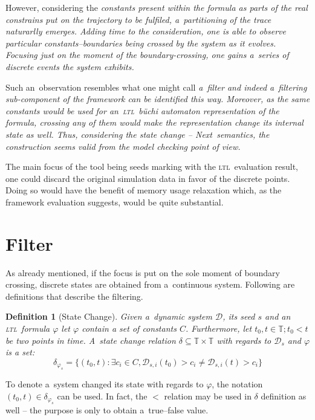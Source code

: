 \documentclass[12pt,oneside,draft]{fithesis}
\newcommand{\ltl}{\textsc{ltl}~}
\newcommand{\Next}{\emph{Next}~}
\newcommand{\mD}{\mathcal{D}}
\newcommand{\mTime}{\mathbb{T}}
\newtheorem{mydef}{Definition}
\begin{document}
However, considering the \em constants \rm present within the formula as parts of the real \em constrains \rm put on the 
trajectory to be fulfiled, a~partitioning of the trace naturarlly emerges. Adding time to the consideration, one is able to
observe particular constants--boundaries being crossed by the system as it evolves. \em Focusing just on the moment of
the boundary-crossing, one gains a~series of discrete events the system exhibits\rm{}.

Such an~observation resembles what one might call \em a~filter \rm and indeed a~filtering sub-component of the framework
can be identified this way. Moreover, as the same constants would be used for an~\ltl b\"{u}chi automaton representation of the formula, 
crossing any of them would make the representation change its internal state as well.
Thus, considering the state change -- \Next semantics, the construction seems valid from the model checking point of view.

The main focus of the tool being seeds marking with the \ltl evaluation result, one could discard the original simulation
data in favor of the discrete points.
Doing so would have the benefit of memory usage relaxation which, as the framework evaluation suggests, would be quite substantial.

\section{Filter}
As already mentioned, if the focus is put on the sole moment of boundary
crossing, discrete states are obtained from a~continuous system.
Following are definitions that describe the filtering.
\begin{mydef}[State Change]
Given a~dynamic system $\mD$, its seed $s$ and an \ltl formula $\varphi$
let $\varphi$ contain a set of constants $C$.
Furthermore, let $t_0,t\in\mTime;t_0<t$ be two points in time.
A~state change relation
$\delta\subseteq\mTime\times\mTime$ with regards to $\mD_s$
and $\varphi$ is a set:
	\begin{equation}
\delta_{\varphi_s} = \{(t_0,t):\exists{}c_i\in{}C,\mD_{s,i}(t_0)>c_i\neq
\mD_{s,i}(t)>c_i\}
	\end{equation}
\end{mydef}
To denote a~system changed its state with regards to $\varphi$, the
notation $(t_0,t)\in\delta_{\varphi_s}$ can be used.
In fact, the $<$ relation may be used in $\delta$ definition as well --
the purpose is only to obtain a~true--false value.
\end{document}
